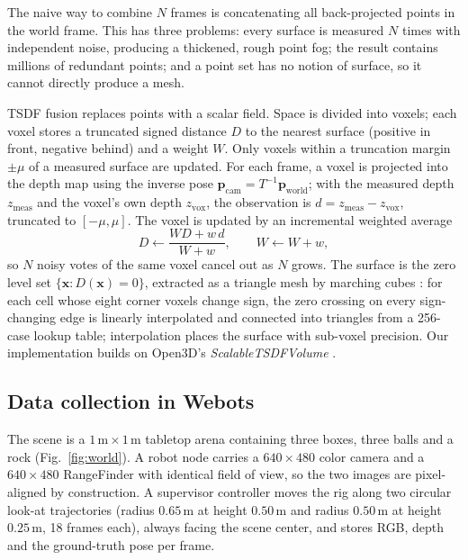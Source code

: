 \documentclass[11pt,a4paper]{article}
\begin{document}
The naive way to combine $N$ frames is concatenating all back-projected points
in the world frame. This has three problems: every surface is measured $N$
times with independent noise, producing a thickened, rough point fog; the
result contains millions of redundant points; and a point set has no notion of
surface, so it cannot directly produce a mesh.

TSDF fusion \cite{kinectfusion} replaces points with a scalar field. Space is divided into voxels;
each voxel stores a truncated signed distance $D$ to the nearest surface
(positive in front, negative behind) and a weight $W$. Only voxels within a
truncation margin $\pm\mu$ of a measured surface are updated. For each frame, a
voxel is projected into the depth map using the inverse pose
$\bm p_{\text{cam}}=T^{-1}\bm p_{\text{world}}$; with the measured depth
$z_{\text{meas}}$ and the voxel's own depth $z_{\text{vox}}$, the observation
is $d=z_{\text{meas}}-z_{\text{vox}}$, truncated to $[-\mu,\mu]$. The voxel is
updated by an incremental weighted average
\begin{equation}
D\leftarrow\frac{W D+w\,d}{W+w},\qquad W\leftarrow W+w,
\label{eq:tsdf}
\end{equation}
so $N$ noisy votes of the same voxel cancel out as $N$ grows. The surface is
the zero level set $\{\bm x:D(\bm x)=0\}$, extracted as a triangle mesh by
marching cubes \cite{marchingcubes}: for each cell whose eight corner voxels change sign, the zero
crossing on every sign-changing edge is linearly interpolated and connected
into triangles from a 256-case lookup table; interpolation places the surface
with sub-voxel precision. Our implementation builds on Open3D's
\emph{ScalableTSDFVolume} \cite{open3d}.

\subsection{Data collection in Webots}

The scene is a $1\,\mathrm{m}\times1\,\mathrm{m}$ tabletop arena \cite{webots}
containing
three boxes, three balls and a rock (Fig.~\ref{fig:world}). A robot node
carries a $640\times480$ color camera and a $640\times480$ RangeFinder with
identical field of view, so the two images are pixel-aligned by construction.
A supervisor controller moves the rig along two circular look-at trajectories
(radius $0.65\,\mathrm{m}$ at height $0.50\,\mathrm{m}$ and radius
$0.50\,\mathrm{m}$ at height $0.25\,\mathrm{m}$, 18 frames each), always facing
the scene center, and stores RGB, depth and the ground-truth pose per frame.
\end{document}
